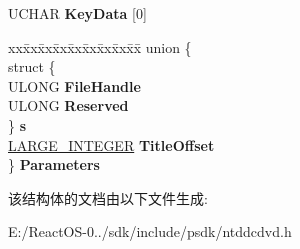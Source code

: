 \begin{DoxyCompactItemize}
\begin{tabbing}
\end{tabbing}\item 
\mbox{\label{struct___d_v_d___c_o_p_y___p_r_o_t_e_c_t___k_e_y_a100fdfc1f1a3c6432b5c0838d4156610}} 
U\+C\+H\+AR {\bfseries Key\+Data} \mbox{[}0\mbox{]}
\item 
\mbox{\label{struct___d_v_d___c_o_p_y___p_r_o_t_e_c_t___k_e_y_a6056902ae5f093826fdcfb474003357e}} 
\begin{tabbing}
xx\=xx\=xx\=xx\=xx\=xx\=xx\=xx\=xx\=\kill
union \{\\
\>struct \{\\
\>\>ULONG {\bfseries FileHandle}\\
\>\>ULONG {\bfseries Reserved}\\
\>\} {\bfseries s}\\
\>\hyperlink{union___l_a_r_g_e___i_n_t_e_g_e_r}{LARGE\_INTEGER} {\bfseries TitleOffset}\\
\} {\bfseries Parameters}\\

\end{tabbing}\end{DoxyCompactItemize}


该结构体的文档由以下文件生成\+:\begin{DoxyCompactItemize}
\item 
E\+:/\+React\+O\+S-\/0../sdk/include/psdk/ntddcdvd.\+h\end{DoxyCompactItemize}

